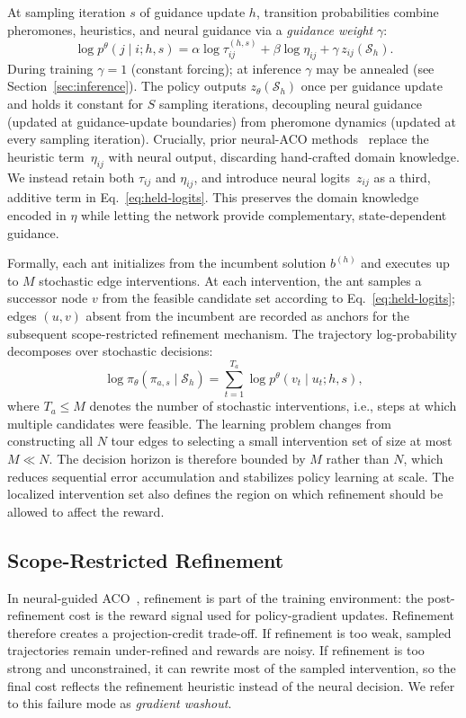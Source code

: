 At sampling iteration $s$ of guidance update $h$, transition probabilities combine pheromones, heuristics, and neural guidance via a \emph{guidance weight} $\gamma$:
\begin{equation}
\log p^\theta(j \mid i; h, s) = \alpha \log \tau^{(h,s)}_{ij} + \beta \log \eta_{ij} + \gamma\, z_{ij}(\mathcal{S}_h).
\label{eq:held-logits}
\end{equation}
During training $\gamma{=}1$ (constant forcing); at inference $\gamma$ may be annealed (see Section~\ref{sec:inference}). The policy outputs $z_\theta(\mathcal{S}_h)$ once per guidance update and holds it constant for $S$ sampling iterations, decoupling neural guidance (updated at guidance-update boundaries) from pheromone dynamics (updated at every sampling iteration). Crucially, prior neural-ACO methods~\cite{deepaco,gfacs,gtgaco} replace the heuristic term~$\eta_{ij}$ with neural output, discarding hand-crafted domain knowledge. We instead retain both $\tau_{ij}$ and $\eta_{ij}$, and introduce neural logits~$z_{ij}$ as a third, additive term in Eq.~\eqref{eq:held-logits}. This preserves the domain knowledge encoded in $\eta$ while letting the network provide complementary, state-dependent guidance.

Formally, each ant initializes from the incumbent solution $b^{(h)}$ and executes up to $M$ stochastic edge interventions. At each intervention, the ant samples a successor node $v$ from the feasible candidate set according to Eq.~\eqref{eq:held-logits}; edges $(u,v)$ absent from the incumbent are recorded as anchors for the subsequent scope-restricted refinement mechanism. The trajectory log-probability decomposes over stochastic decisions:
\begin{equation}
\log \pi_\theta(\pi_{a,s} \mid \mathcal{S}_h) = \sum_{t=1}^{T_a} \log p^\theta(v_t \mid u_t; h, s),
\label{eq:logp-trajectory}
\end{equation}
where $T_a \le M$ denotes the number of stochastic interventions, i.e., steps at which multiple candidates were feasible. The learning problem changes from constructing all $N$ tour edges to selecting a small intervention set of size at most $M \ll N$. The decision horizon is therefore bounded by $M$ rather than $N$, which reduces sequential error accumulation and stabilizes policy learning at scale. The localized intervention set also defines the region on which refinement should be allowed to affect the reward.

\subsection{Scope-Restricted Refinement}
\label{sec:localized-ls}
In neural-guided ACO~\cite{deepaco,gfacs,gtgaco}, refinement is part of the training environment: the post-refinement cost is the reward signal used for policy-gradient updates. Refinement therefore creates a projection-credit trade-off. If refinement is too weak, sampled trajectories remain under-refined and rewards are noisy. If refinement is too strong and unconstrained, it can rewrite most of the sampled intervention, so the final cost reflects the refinement heuristic instead of the neural decision. We refer to this failure mode as \emph{gradient washout}.

